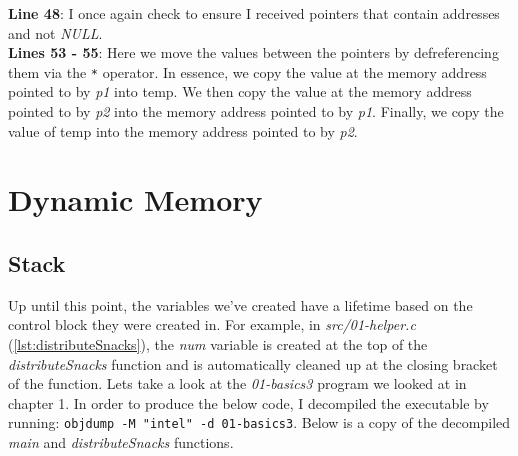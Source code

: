 \documentclass[../main.tex]{subfiles}
\begin{document}
	\textbf{Line 48}: I once again check to ensure I received pointers that contain addresses and not \textit{NULL}.\\
	\textbf{Lines 53 - 55}: Here we move the values between the pointers by defreferencing them via the \texttt{*} operator.  In essence, we copy the value at the memory address pointed to by \textit{p1} into temp.  We then copy the value at the memory address pointed to by \textit{p2} into the memory address pointed to by \textit{p1}.  Finally, we copy the value of temp into the memory address pointed to by \textit{p2}.\\
	
	
	\section{Dynamic Memory}
	
	
	
	\subsection{Stack}
	Up until this point, the variables we've created have a lifetime based on the control block they were created in.  For example, in \textit{src/01-helper.c} (\ref{lst:distributeSnacks}), the \textit{num} variable is created at the top of the \textit{distributeSnacks} function and is automatically cleaned up at the closing bracket of the function.  Lets take a look at the \textit{01-basics3} program we looked at in chapter 1.  In order to produce the below code, I decompiled the executable by running: \texttt{objdump -M "intel" -d 01-basics3}. Below is a copy of the decompiled \textit{main} and \textit{distributeSnacks} functions. \\ 
	
\end{document}
